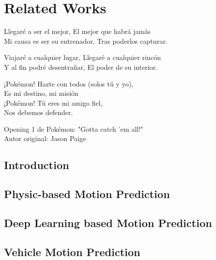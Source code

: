 % 
% 
% 
% 
% 
% 
% 

\chapter{Related Works}
\label{cha:related_works}

\begin{FraseCelebre}
	\begin{Frase}
		Llegaré a ser el mejor, El mejor que habrá jamás \\
		Mi causa es ser su entrenador, Tras poderlos capturar.  

		Viajaré a cualquier lugar, Llegaré a cualquier rincón \\  
		Y al fin podré desentrañar, El poder de su interior.  

		¡Pokémon! Hazte con todos (solos tú y yo), \\
		Es mi destino, mi misión \\
		¡Pokémon! Tú eres mi amigo fiel, \\
		Nos debemos defender.
	\end{Frase}
	\begin{Fuente}
		Opening 1 de Pokémon: "Gotta catch 'em all!" \\
		Autor original: Jason Paige
	\end{Fuente}
\end{FraseCelebre}


\section{Introduction}
\label{sec:2_introduction}

\section{Physic-based Motion Prediction}
\label{sec:2_physic_based_mp}

\section{Deep Learning based Motion Prediction}
\label{sec:2_dl_based_mp}

\section{Vehicle Motion Prediction}
\label{sec:2_vehicle_based_mp}